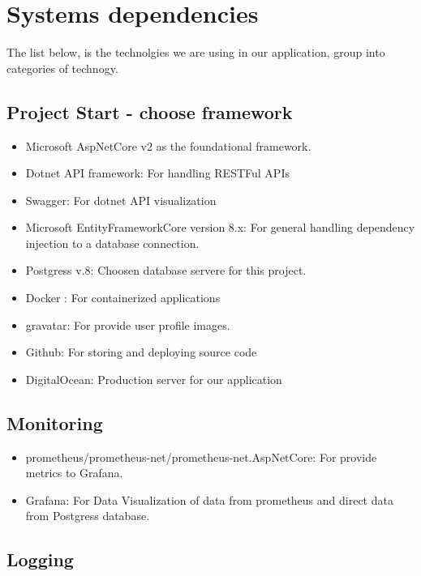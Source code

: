 \section{Systems dependencies}

The list below, is the technolgies we are using in our application, group into categories of technogy.

\subsection*{Project Start - choose framework}

\begin{itemize}
	\item Microsoft AspNetCore v2 as the foundational framework.
	\item Dotnet API framework: For handling RESTFul APIs
	\item Swagger: For dotnet API visualization
	\item Microsoft EntityFrameworkCore version 8.x: For general handling dependency injection to a database connection.
	\item Postgress v.8: Choosen database servere for this project.
	\item Docker : For containerized applications
	\item gravatar: For provide user profile images.
	\item Github: For storing and deploying source code
	\item DigitalOcean: Production server for our application
\end{itemize}

\subsection*{Monitoring}

\begin{itemize}
	\item prometheus/prometheus-net/prometheus-net.AspNetCore: For provide metrics to Grafana.
	\item Grafana: For Data Visualization of data from prometheus and direct data from Postgress database.
\end{itemize}

\subsection*{Logging}

